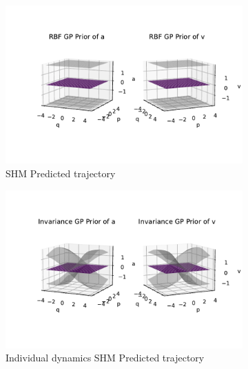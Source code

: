 \documentclass{statsmsc}
\begin{document}
\begin{figure}[H]
     \centering
     \begin{subfigure}[b]{\linewidth}
        \centering
        \includegraphics[width=\linewidth]{../codes/figures/prior_shm_rbf.pdf}
        \caption{SHM Predicted trajectory}
        \label{fig:prior_shm_rbf}
     \end{subfigure}
     \hfill
     \begin{subfigure}[b]{\linewidth}
         \centering
         \includegraphics[width=\linewidth]{../codes/figures/prior_shm_invariance.pdf}
         \caption{Individual dynamics SHM Predicted trajectory}
         \label{fig:prior_shm_invariance}
     \end{subfigure}
     \hfill
     \begin{subfigure}[b]{\linewidth}
         \centering

\end{subfigure}
\end{figure}
\end{document}
